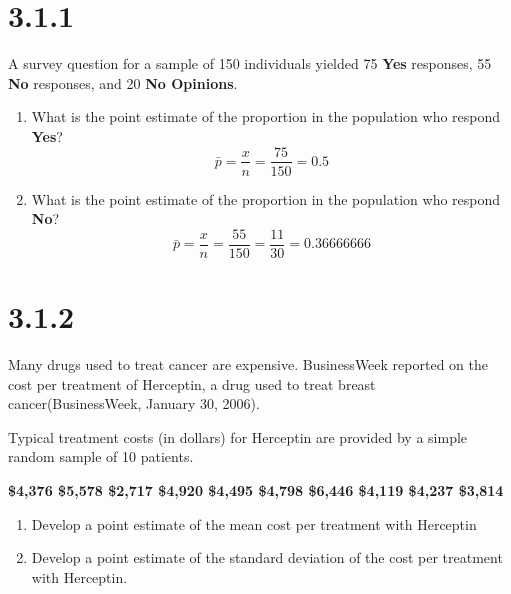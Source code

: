\documentclass{article}
\begin{document}
\section*{3.1.1}
A survey question for a sample of 150 individuals yielded 75 \textbf{Yes} responses, 55 \textbf{No} responses, and 20 \textbf{No Opinions}.
\begin{enumerate}
  \item What is the point estimate of the proportion in the population who respond \textbf{Yes}?
  \begin{equation*}
    \bar{p} = \frac{x}{n} = \frac{75}{150} = 0.5
  \end{equation*}
  \item What is the point estimate of the proportion in the population who respond \textbf{No}?
  \begin{equation*}
    \bar{p} = \frac{x}{n} = \frac{55}{150} = \frac{11}{30} = 0.36666666
  \end{equation*}
\end{enumerate}

\section*{3.1.2}
Many drugs used to treat cancer are expensive. BusinessWeek reported on the cost per treatment of Herceptin, a drug used to treat breast cancer(BusinessWeek, January 30, 2006).

Typical treatment costs (in dollars) for Herceptin are provided by a simple random sample of 10 patients.
\begin{center}
  \textbf{\$4,376 \$5,578 \$2,717 \$4,920 \$4,495 \$4,798 \$6,446 \$4,119 \$4,237 \$3,814}
\end{center}

\begin{enumerate}
  \item Develop a point estimate of the mean cost per treatment with Herceptin
  \item Develop a point estimate of the standard deviation of the cost per treatment with Herceptin.
\end{enumerate}
\end{document}
